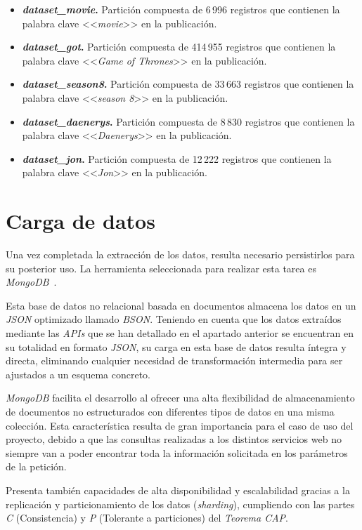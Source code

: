 \begin{itemize}
    \item \textbf{\textit{dataset\_movie}.} Partición compuesta de 6\,996 registros que contienen la palabra clave <<\textit{movie}>> en la publicación.
    \item \textbf{\textit{dataset\_got}.} Partición compuesta de 414\,955 registros que contienen la palabra clave <<\textit{Game of Thrones}>> en la publicación.
    \item \textbf{\textit{dataset\_season8}.} Partición compuesta de 33\,663 registros que contienen la palabra clave <<\textit{season 8}>> en la publicación.
    \item \textbf{\textit{dataset\_daenerys}.} Partición compuesta de 8\,830 registros que contienen la palabra clave <<\textit{Daenerys}>> en la publicación.
    \item \textbf{\textit{dataset\_jon}.} Partición compuesta de 12\,222 registros que contienen la palabra clave <<\textit{Jon}>> en la publicación.
\end{itemize}

\section{Carga de datos}

Una vez completada la extracción de los datos, resulta necesario persistirlos para su posterior uso. La herramienta seleccionada para realizar esta tarea es \textit{MongoDB}~\cite{mongodbArchitecture}.

Esta base de datos no relacional basada en documentos almacena los datos en un \textit{JSON} optimizado llamado \textit{BSON}. Teniendo en cuenta que los datos extraídos mediante las \textit{APIs} que se han detallado en el apartado anterior se encuentran en su totalidad en formato \textit{JSON}, su carga en esta base de datos resulta íntegra y directa, eliminando cualquier necesidad de transformación intermedia para ser ajustados a un esquema concreto.

\textit{MongoDB} facilita el desarrollo al ofrecer una alta flexibilidad de almacenamiento de documentos no estructurados con diferentes tipos de datos en una misma colección. Esta característica resulta de gran importancia para el caso de uso del proyecto, debido a que las consultas realizadas a los distintos servicios web no siempre van a poder encontrar toda la información solicitada en los parámetros de la petición.

Presenta también capacidades de alta disponibilidad y escalabilidad gracias a la replicación y particionamiento de los datos (\textit{sharding}), cumpliendo con las partes \textit{C} (Consistencia) y \textit{P} (Tolerante a particiones) del \textit{Teorema CAP}.

